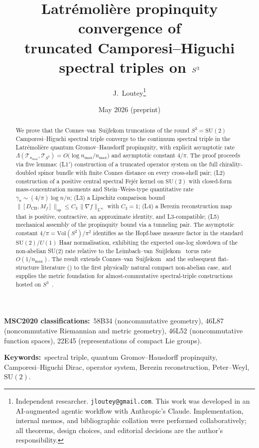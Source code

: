 \documentclass[11pt,a4paper]{article}
\title{Latr\'emoli\`ere propinquity convergence of \\
truncated Camporesi--Higuchi spectral triples on $\sthree$}
\author{J.~Loutey\thanks{Independent researcher. \texttt{jloutey@gmail.com}.
This work was developed in an AI-augmented agentic workflow with
Anthropic's Claude. Implementation, internal memos, and bibliographic
collation were performed collaboratively; all theorems, design choices,
and editorial decisions are the author's responsibility.}}
\date{May 2026 (preprint)}
\theoremstyle{plain}
\theoremstyle{definition}
\newcommand{\nmax}{n_{\max}}
\newcommand{\sthree}{S^{3}}
\newcommand{\Tcal}{\mathcal{T}}
\newcommand{\opnorm}[1]{\lVert #1 \rVert_{\mathrm{op}}}
\newcommand{\norm}[1]{\lVert #1 \rVert}
\newcommand{\SU}{\mathrm{SU}}
\newcommand{\Vol}{\mathrm{Vol}}
\newcommand{\Mat}{M}
\newcommand{\DCH}{D_{\mathrm{CH}}}
\begin{document}
\maketitle

\begin{abstract}
We prove that the Connes--van~Suijlekom truncations of the round
$\sthree = \SU(2)$ Camporesi--Higuchi spectral triple converge to the
continuum spectral triple in the Latr\'emoli\`ere quantum
Gromov--Hausdorff propinquity, with explicit asymptotic rate
\(
\Lambda(\Tcal_{\nmax}, \Tcal_{\sthree}) = O\!\bigl(\log \nmax / \nmax\bigr)
\)
and asymptotic constant $4/\pi$. The proof proceeds via five lemmas:
(L1$'$) construction of a truncated operator system on the full
chirality-doubled spinor bundle with finite Connes distance on every
cross-shell pair; (L2) construction of a positive central spectral
Fej\'er kernel on $\SU(2)$ with closed-form mass-concentration moments
and Stein--Weiss-type quantitative rate $\gamma_n \sim (4/\pi)\log n / n$;
(L3) a Lipschitz comparison bound
$\opnorm{[\DCH, \Mat_f]} \leq C_3\,\norm{\nabla f}_{L^\infty}$ with
$C_3 = 1$; (L4) a Berezin reconstruction map that is positive,
contractive, an approximate identity, and L3-compatible; (L5)
mechanical assembly of the propinquity bound via a tunneling pair.
The asymptotic constant $4/\pi = \Vol(S^2)/\pi^2$ identifies as the
Hopf-base measure factor in the standard $\SU(2)/U(1)$ Haar
normalisation, exhibiting the expected one-log slowdown of the
non-abelian SU(2) rate relative to the
Leimbach--van~Suijlekom~\cite{leimbach_vs2024} torus rate $O(1/\nmax)$.
The result extends Connes--van~Suijlekom~\cite{connes_vs2021} and the
subsequent flat-structure literature
(\cite{hekkelman2022, hekkelman_mcdonald2024, leimbach_vs2024}) to the
first physically natural compact non-abelian case, and supplies the
metric foundation for almost-commutative spectral-triple constructions
hosted on $\sthree$~\cite{marcolli_vs2014}.
\end{abstract}

\bigskip\noindent
\textbf{MSC2020 classifications:}\ 58B34 (noncommutative geometry),
46L87 (noncommutative Riemannian and metric geometry),
46L52 (noncommutative function spaces),
22E45 (representations of compact Lie groups).

\medskip\noindent
\textbf{Keywords:}\ spectral triple, quantum Gromov--Hausdorff
propinquity, Camporesi--Higuchi Dirac, operator system, Berezin
reconstruction, Peter--Weyl, $\SU(2)$.

\end{document}

